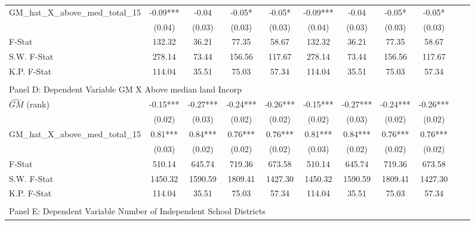 \begin{table}[htbp]
\begin{threeparttable}
\begin{tabular}{l*{10}{c}}
\addlinespace
GM\_hat\_X\_above\_med\_total\_15&      -0.09***&      -0.04   &      -0.05*  &      -0.05*  &      -0.09***&      -0.04   &      -0.05*  &      -0.05*  \\
                &     (0.04)   &     (0.03)   &     (0.03)   &     (0.03)   &     (0.04)   &     (0.03)   &     (0.03)   &     (0.03)   \\
\midrule
F-Stat          &     132.32   &      36.21   &      77.35   &      58.67   &     132.32   &      36.21   &      77.35   &      58.67   \\
S.W. F-Stat     &     278.14   &      73.44   &     156.56   &     117.67   &     278.14   &      73.44   &     156.56   &     117.67   \\
K.P. F-Stat     &     114.04   &      35.51   &      75.03   &      57.34   &     114.04   &      35.51   &      75.03   &      57.34   \\
\cmidrule[\heavyrulewidth](lr){1-9} \\ \cmidrule[\heavyrulewidth](lr){1-9}
\multicolumn{8}{l}{Panel D: Dependent Variable GM X Above median land Incorp}\\
\cmidrule(lr){1-9}
$\hat{GM}$ (rank)&      -0.15***&      -0.27***&      -0.24***&      -0.26***&      -0.15***&      -0.27***&      -0.24***&      -0.26***\\
                &     (0.02)   &     (0.03)   &     (0.02)   &     (0.02)   &     (0.02)   &     (0.03)   &     (0.02)   &     (0.02)   \\
\addlinespace
GM\_hat\_X\_above\_med\_total\_15&       0.81***&       0.84***&       0.76***&       0.76***&       0.81***&       0.84***&       0.76***&       0.76***\\
                &     (0.03)   &     (0.02)   &     (0.02)   &     (0.02)   &     (0.03)   &     (0.02)   &     (0.02)   &     (0.02)   \\
\midrule
F-Stat          &     510.14   &     645.74   &     719.36   &     673.58   &     510.14   &     645.74   &     719.36   &     673.58   \\
S.W. F-Stat     &    1450.32   &    1590.59   &    1809.41   &    1427.30   &    1450.32   &    1590.59   &    1809.41   &    1427.30   \\
K.P. F-Stat     &     114.04   &      35.51   &      75.03   &      57.34   &     114.04   &      35.51   &      75.03   &      57.34   \\
\cmidrule[\heavyrulewidth](lr){1-9} \\ \cmidrule[\heavyrulewidth](lr){1-9}
\multicolumn{8}{l}{Panel E: Dependent Variable Number of Independent School Districts}\\

\end{tabular}
\end{threeparttable}
\end{table}
